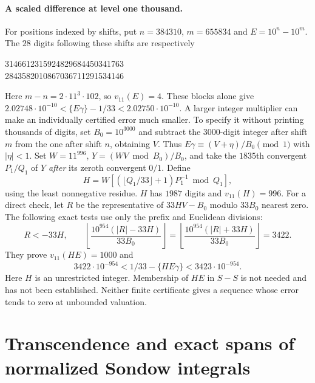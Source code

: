 \documentclass[11pt,a4paper]{article}
\theoremstyle{definition}\newtheorem{definition}[theorem]{Definition}\newtheorem{example}[theorem]{Example}
\theoremstyle{remark}\newtheorem{remark}[theorem]{Remark}
\begin{document}
\paragraph{A scaled difference at level one thousand.}
For positions indexed by shifts, put $n=384310$, $m=655834$ and
$E=10^n-10^m$. The $28$ digits following these shifts are respectively
\begin{center}\ttfamily\small
3146612315924829684450341763\\
2843582010867036711291534146
\end{center}
Here $m-n=2\cdot11^3\cdot102$, so $v_{11}(E)=4$. These blocks alone give
$2.02748\cdot10^{-10}<\{E\gamma\}-1/33<2.02750\cdot10^{-10}$.
A larger integer multiplier can make an individually certified error much
smaller. To specify it without printing thousands of digits, set $B_0=10^{3000}$
and subtract the $3000$-digit integer after shift $m$ from the one after
shift $n$, obtaining $V$. Thus
$E\gamma\equiv(V+\eta)/B_0\pmod1$ with $|\eta|<1$.
Set $W=11^{996}$, $Y=(WV\bmod B_0)/B_0$, and take the $1835$th convergent
$P_1/Q_1$ of $Y$ \emph{after} its zeroth convergent $0/1$. Define
\[
 H=W\left[\left(\lfloor Q_1/33\rfloor+1\right)P_1^{-1}\bmod Q_1\right],
\]
using the least nonnegative residue. $H$ has $1987$ digits and $v_{11}(H)=996$.
For a direct check, let $R$ be the representative of $33HV-B_0$ modulo
$33B_0$ nearest zero. The following exact tests use only the prefix and
Euclidean divisions:
\[
 R<-33H,\qquad
 \left\lfloor\frac{10^{954}(|R|-33H)}{33B_0}\right\rfloor=
 \left\lfloor\frac{10^{954}(|R|+33H)}{33B_0}\right\rfloor=3422.
\]
They prove $v_{11}(HE)=1000$ and
\[
3422\cdot10^{-954}<1/33-\{HE\gamma\}<3423\cdot10^{-954}.
\]
Here $H$ is an unrestricted integer. Membership of $HE$ in $S-S$ is not
needed and has not been established. Neither finite certificate gives a
sequence whose error tends to zero at unbounded valuation.
\section{Transcendence and exact spans of normalized Sondow integrals}
\label{sec:unified-baker}
\end{document}

